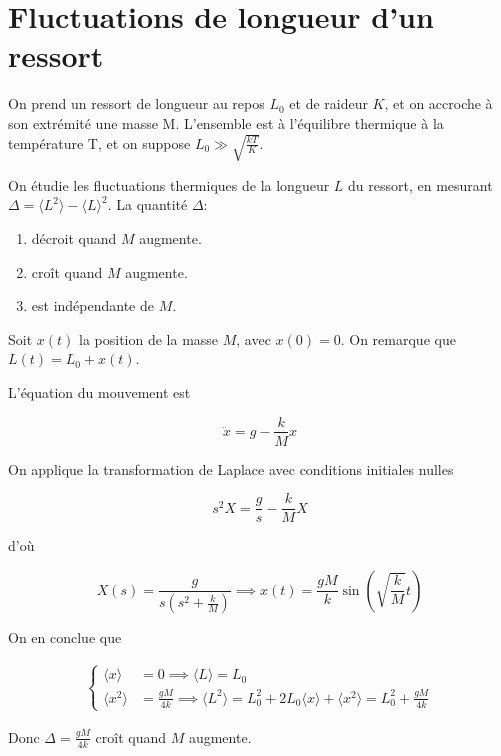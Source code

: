 \documentclass[french]{article}
\begin{document}
	\section{Fluctuations de longueur d'un ressort}
	\begin{tcolorbox}[colback=blue!5!white,colframe=blue!75!black]
	\quad On prend un ressort de longueur au repos $L_0$ et de raideur $K$, et on accroche à son extrémité une masse M. L'ensemble est à l'équilibre thermique à la température T, et on suppose $L_0 \gg \sqrt{\frac{kT}{K}}$.
	
	\quad On étudie les fluctuations thermiques de la longueur $L$ du ressort, en mesurant $\Delta = \langle L^2 \rangle - \langle L \rangle^2$. La quantité $\Delta$:
	\begin{enumerate}
		\item décroit quand $M$ augmente.
		\item croît quand $M$ augmente.
		\item est indépendante de $M$.
	\end{enumerate}
	\end{tcolorbox}

	Soit $x(t)$ la position de la masse $M$, avec $x(0) = 0$. On remarque que $L(t) = L_0 + x(t)$.

	L'équation du mouvement est
	
	$$ \ddot{x} = g - \frac{k}{M} x $$
	
	On applique la transformation de Laplace avec conditions initiales nulles
	
	$$ s^2 X = \frac{g}{s} - \frac{k}{M}X $$
	
	d'où
	
	$$ X(s) = \frac{g}{s \left(s^2 + \frac{k}{M}\right)} \implies x(t) = \frac{gM}{k} \sin\left(\sqrt{\frac{k}{M}} t \right)  $$
	
	On en conclue que 
	
	\begin{align}
		\begin{cases}
		\langle x \rangle &= 0 \implies \langle L \rangle = L_0 \\
		\langle x^2 \rangle &= \frac{gM}{4k} \implies \langle L^2 \rangle = L_0^2 + 2L_0\langle x \rangle + \langle x^2 \rangle = L_0^2 + \frac{gM}{4k}
		\end{cases}
	\end{align}
	
	Donc $\Delta = \frac{gM}{4k}$ croît quand $M$ augmente.
	
\end{document}
